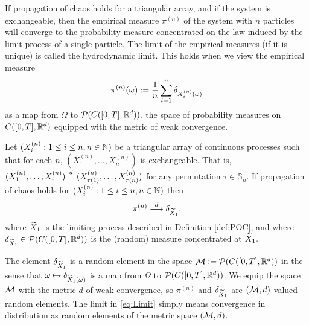 If propagation of chaos holds for a triangular array, and if the system is exchangeable, then the empirical 
measure $\pi^{(n)}$ of the system with $n$ particles will converge to the probability measure concentrated on the law induced by the limit process of a single particle. The limit of the empirical measures (if it is unique) is called the hydrodynamic limit. This holds when we view the empirical measure
\[
\pi^{(n)}(\omega) := \frac{1}{n}\sum_{i = 1}^n\delta_{X_i^{(n)}(\omega)}
\]
as a map from $\Omega$ to $\mathcal{P}(C([0, T], \mathbb{R}^d)),$ the space of probability measures on $C([0, T], \mathbb{R}^d)$
equipped with the metric of weak convergence.
\begin{proposition}\label{prop:POCHyd}
	Let $(X_i^{(n)}: 1 \leq i \leq n, n \in \mathbb{N})$ be a triangular array of continuous processes such that for each $n$, $(X_1^{(n)}, \dots, X_n^{(n)})$ is exchangeable. That is, $(X_1^{(n)}, \dots, X_i^{(n)}) \overset{d}{=} (X_{\tau(1)}^{(n)}, \dots, X_{\tau(n)}^{(n)})$ for any permutation $\tau \in \mathbb{S}_n.$ If propagation of chaos holds for $(X_i^{(n)}: 1 \leq i \leq n, n \in \mathbb{N})$ then 
	\begin{align}\label{eq:Limit}
		\pi^{(n)}  \overset{d}{\longrightarrow} \delta_{\widetilde{X}_1},
	\end{align}
	where $\widetilde{X}_1$ is the limiting process described in Definition \ref{def:POC}, and where $\delta_{\widetilde{X}_1} \in \mathcal{P}(C([0, T], \mathbb{R}^d))$ is the (random) measure concentrated at $\widetilde{X}_1.$
\end{proposition}
\begin{remark}\label{remark:weakConv}
	The element $\delta_{\widetilde{X}_1}$ is a random element in the space $\mathcal{M} := \mathcal{P}(C([0, T], \mathbb{R}^d))$ in the sense that $\omega \mapsto \delta_{\widetilde{X}_1(\omega)}$ is a map from $\Omega$ to $\mathcal{P}(C([0, T], \mathbb{R}^d))$. We equip the space $\mathcal{M}$ with the metric $d$ of weak convergence, so $\pi^{(n)}$ and $\delta_{\widetilde{X}_1}$ are $(\mathcal{M}, d)$ valued random elements. The limit in \eqref{eq:Limit} simply means convergence in distribution as random elements of the metric space $(\mathcal{M}, d).$
\end{remark}

